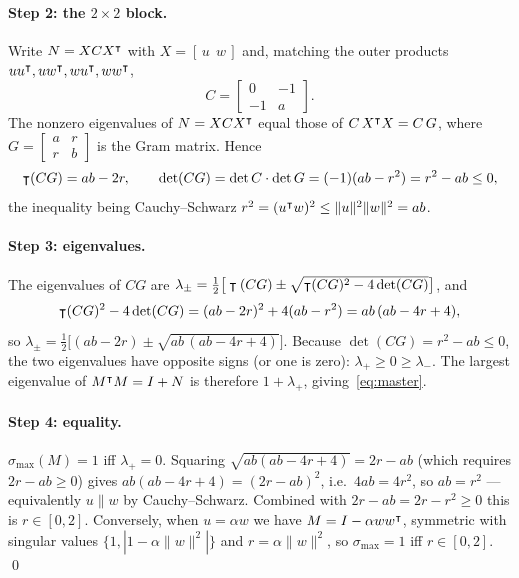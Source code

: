 \documentclass[11pt,letterpaper,logo]{yalearxiv}
\newcommand{\smax}{\sigma_{\max}}
\begin{document}
\paragraph{Step 2: the $2\times2$ block.}
Write $N = X C X^{\intercal}$ with $X = [\,u\ \ w\,]$ and, matching the outer products
$u u^{\intercal}, u w^{\intercal}, w u^{\intercal}, w w^{\intercal}$,
\begin{equation*}
  C = \begin{bmatrix} 0 & -1 \\ -1 & a \end{bmatrix}.
\end{equation*}
The nonzero eigenvalues of $N = X C X^{\intercal}$ equal those of
$C\,X^{\intercal}X = C\,G$, where $G = \begin{bmatrix} a & r \\ r & b \end{bmatrix}$ is the Gram
matrix. Hence
\begin{equation*}
  \intercal(CG) = ab - 2r, \qquad
  \det(CG) = \det C \cdot \det G = (-1)(ab - r^2) = r^2 - ab \le 0,
\end{equation*}
the inequality being Cauchy--Schwarz $r^2 = (u^{\intercal}w)^2 \le \|u\|^2\|w\|^2 = ab$.

\paragraph{Step 3: eigenvalues.}
The eigenvalues of $CG$ are
$\lambda_\pm = \tfrac12\big[\intercal(CG) \pm \sqrt{\intercal(CG)^2 - 4\det(CG)}\big]$, and
\begin{equation*}
  \intercal(CG)^2 - 4\det(CG) = (ab - 2r)^2 + 4(ab - r^2) = ab\,(ab - 4r + 4),
\end{equation*}
so $\lambda_\pm = \tfrac12\big[(ab - 2r) \pm \sqrt{ab\,(ab - 4r + 4)}\big]$. Because
$\det(CG) = r^2 - ab \le 0$, the two eigenvalues have opposite signs (or one is zero):
$\lambda_+ \ge 0 \ge \lambda_-$. The largest eigenvalue of $M^{\intercal}M = I + N$ is therefore
$1 + \lambda_+$, giving~\eqref{eq:master}.

\paragraph{Step 4: equality.}
$\smax(M) = 1$ iff $\lambda_+ = 0$. Squaring $\sqrt{ab(ab-4r+4)} = 2r - ab$ (which requires
$2r - ab \ge 0$) gives $ab(ab-4r+4) = (2r-ab)^2$, i.e.\ $4ab = 4r^2$, so $ab = r^2$ ---
equivalently $u \parallel w$ by Cauchy--Schwarz. Combined with $2r - ab = 2r - r^2 \ge 0$
this is $r \in [0,2]$. Conversely, when $u = \alpha w$ we have $M = I - \alpha w w^{\intercal}$,
symmetric with singular values $\{1, |1 - \alpha\|w\|^2|\}$ and
$r = \alpha\|w\|^2$, so $\smax = 1$ iff $r \in [0,2]$. \qed
\end{document}
